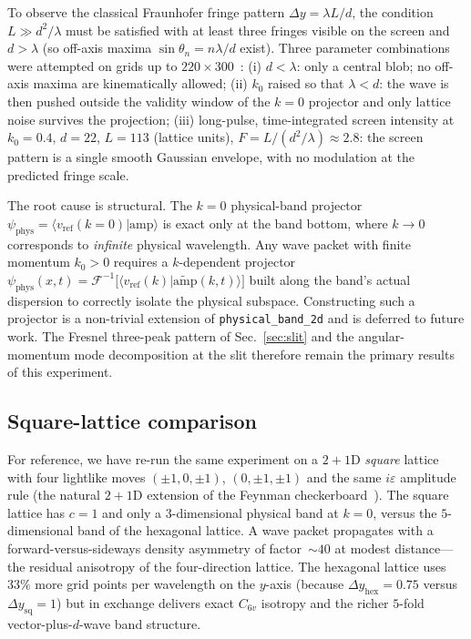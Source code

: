 \documentclass[twocolumn,showpacs,preprintnumbers,amsmath,amssymb]{revtex4-2}
\newcommand{\eps}{\varepsilon}
\newcommand{\Csix}{C_{6v}}
\begin{document}
To observe the classical Fraunhofer fringe pattern
$\Delta y=\lambda L/d$, the condition $L\gg d^{2}/\lambda$ must be
satisfied with at least three fringes visible on the screen and
$d>\lambda$ (so off-axis maxima $\sin\theta_{n}=n\lambda/d$ exist).
Three parameter combinations were attempted on grids up to
$220{\times}300$~\cite{farfield-results}:
(i) $d<\lambda$: only a central blob; no off-axis maxima are kinematically
allowed;
(ii) $k_{0}$ raised so that $\lambda<d$: the wave is then pushed outside
the validity window of the $k=0$ projector and only lattice noise
survives the projection;
(iii) long-pulse, time-integrated screen intensity at
$k_{0}=0.4$, $d=22$, $L=113$ (lattice units), $F=L/(d^{2}/\lambda)\approx
2.8$: the screen pattern is a single smooth Gaussian envelope, with no
modulation at the predicted fringe scale.

The root cause is structural.
The $k=0$ physical-band projector
$\psi_{\text{phys}}=\langle v_{\text{ref}}(k=0)|\text{amp}\rangle$
is exact only at the band bottom, where $k\to 0$ corresponds to
\emph{infinite} physical wavelength.
Any wave packet with finite momentum $k_{0}>0$ requires a
$k$-dependent projector
$\psi_{\text{phys}}(x,t)=\mathcal{F}^{-1}\!\bigl[\langle v_{\text{ref}}(k)
|\widetilde{\text{amp}}(k,t)\rangle\bigr]$
built along the band's actual dispersion to correctly isolate the
physical subspace.
Constructing such a projector is a non-trivial extension of
\texttt{physical\_band\_2d} and is deferred to future work.
The Fresnel three-peak pattern of Sec.~\ref{sec:slit} and the
angular-momentum mode decomposition at the slit therefore remain the
primary results of this experiment.

\subsection{Square-lattice comparison}

For reference, we have re-run the same experiment on a $2{+}1$D
\emph{square} lattice with four lightlike moves $(\pm 1,0,\pm 1)$,
$(0,\pm 1,\pm 1)$ and the same $i\eps$ amplitude rule (the natural
$2{+}1$D extension of the Feynman checkerboard~\cite{feynman1965}).
The square lattice has $c=1$ and only a $3$-dimensional physical band
at $k=0$, versus the $5$-dimensional band of the hexagonal lattice.
A wave packet propagates with a forward-versus-sideways density
asymmetry of factor~$\sim\!40$ at modest distance---the residual
anisotropy of the four-direction lattice.
The hexagonal lattice uses $33\%$ more grid points per wavelength on
the $y$-axis (because $\Delta y_{\text{hex}}=0.75$ versus
$\Delta y_{\text{sq}}=1$) but in exchange delivers
exact $\Csix$ isotropy and the richer $5$-fold vector-plus-$d$-wave
band structure.
\end{document}
